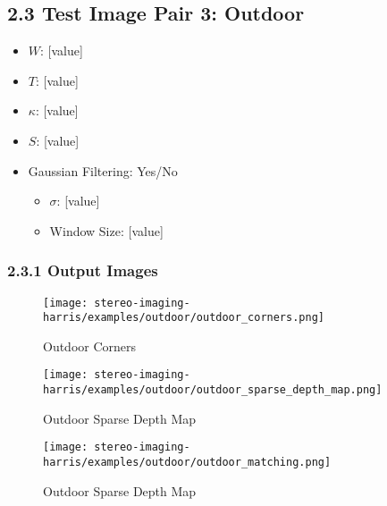 \documentclass[12pt]{article}
\begin{document}
\subsection*{2.3 Test Image Pair 3: Outdoor}
\begin{itemize}
    \item $W$: [value]
    \item $T$: [value]
    \item $\kappa$: [value]
    \item $S$: [value]
    \item Gaussian Filtering: Yes/No
    \begin{itemize}
        \item $\sigma$: [value]
        \item Window Size: [value]
    \end{itemize}
\end{itemize}

\subsubsection*{2.3.1 Output Images}
\begin{figure}[H]
    \centering
    \texttt{[image: stereo-imaging-harris/examples/outdoor/outdoor\_corners.png]}
    \caption{Outdoor Corners}
\end{figure}
\begin{figure}[H]
    \centering
    \texttt{[image: stereo-imaging-harris/examples/outdoor/outdoor\_sparse\_depth\_map.png]}
    \caption{Outdoor Sparse Depth Map}
\end{figure}
\begin{figure}[H]
    \centering
    \texttt{[image: stereo-imaging-harris/examples/outdoor/outdoor\_matching.png]}
    \caption{Outdoor Sparse Depth Map}
\end{figure}


\end{document}
